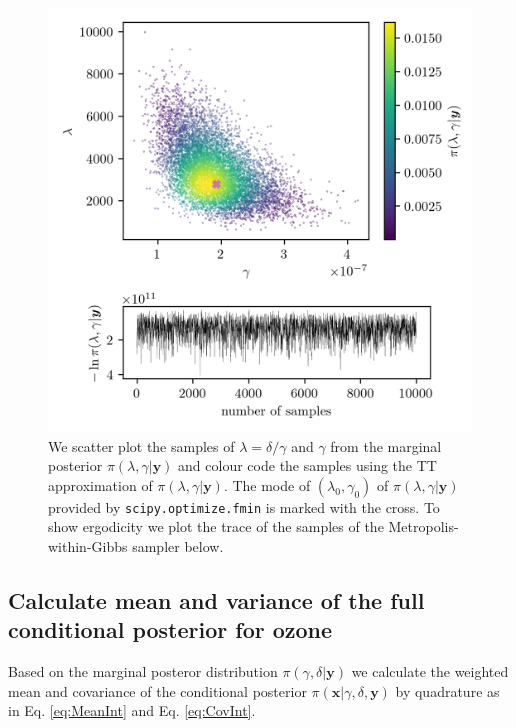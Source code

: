 \begin{figure}[ht!]
	\centering
	\includegraphics{ScatterplusHistoPlusTT.png}
	\caption[Scatter plot of samples from marginal posterior, including weighting from TT approximation; additional trace plot of the marginal posterior samples.]{We scatter plot the samples of $\lambda = \delta / \gamma $ and $\gamma$ from the marginal posterior $\pi(\lambda , \gamma  | \bm{y})$ and colour code the samples using the TT approximation of $\pi(\lambda , \gamma  | \bm{y})$. The mode of $(\lambda_0 , \gamma_0)$ of $\pi(\lambda , \gamma  | \bm{y})$ provided by \texttt{scipy.optimize.fmin} is marked with the cross. To show ergodicity we plot the trace of the samples of the Metropolis-within-Gibbs sampler below.}
	\label{fig:ScatterPlotTT}
\end{figure}


\subsection{Calculate mean and variance of the full conditional posterior for ozone}
\label{subsec:firstCond}
Based on the marginal posteror distribution $\pi(\gamma, \delta | \bm{y})$ we calculate the weighted mean and covariance of the conditional posterior $\pi(\bm{x} | \gamma, \delta, \bm{y})$ by quadrature as in Eq. \ref{eq:MeanInt} and Eq. \ref{eq:CovInt}.

